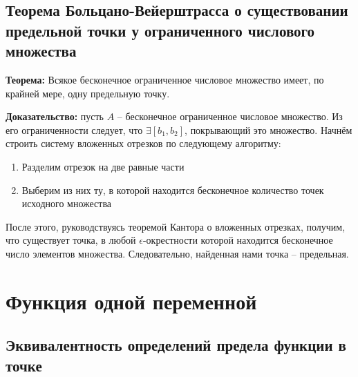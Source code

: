 \documentclass{article}
\begin{document}
\subsection{Теорема Больцано-Вейерштрасса о существовании предельной точки у ограниченного числового множества}

\noindent{}

\textbf{Теорема:} Всякое бесконечное ограниченное числовое множество имеет, по крайней мере, одну предельную точку.

\textbf{Доказательство:} пусть $A$ -- бесконечное ограниченное числовое множество. Из его ограниченности следует, что $\exists [b_1, b_2]$, покрывающий это множество. Начнём строить систему вложенных отрезков по следующему алгоритму:
\begin{enumerate}
    \item Разделим отрезок на две равные части
    \item Выберим из них ту, в которой находится бесконечное количество точек исходного множества
\end{enumerate}

После этого, руководствуясь теоремой Кантора о вложенных отрезках, получим, что существует точка, в любой $\epsilon$-окрестности которой находится бесконечное число элементов множества. Следовательно, найденная нами точка -- предельная.

\section{Функция одной переменной}

\noindent{}

\subsection{Эквивалентность определений предела функции в точке}

\noindent{}
\end{document}
